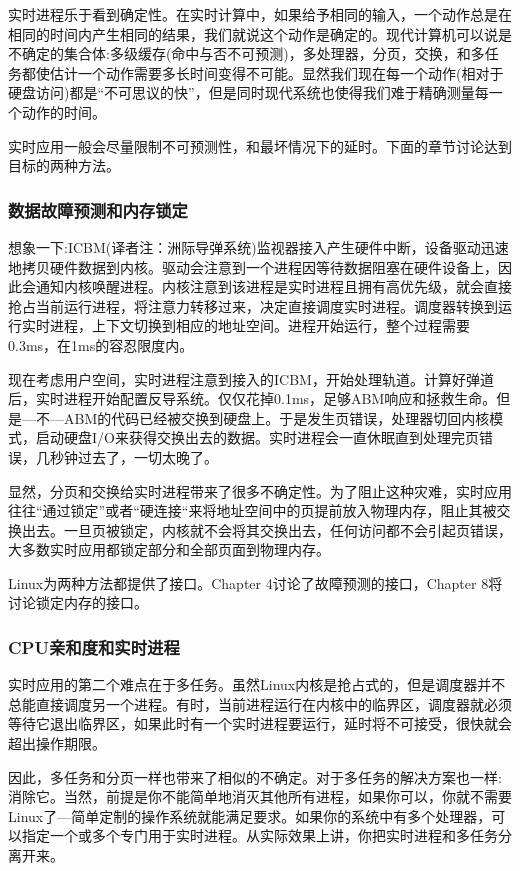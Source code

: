   实时进程乐于看到确定性。在实时计算中，如果给予相同的输入，一个动作总是在相同的时间内产生相同的结果，我们就说这个动作是确定的。现代计算机可以说是不确定的集合体:多级缓存(命中与否不可预测)，多处理器，分页，交换，和多任务都使估计一个动作需要多长时间变得不可能。显然我们现在每一个动作(相对于硬盘访问)都是“不可思议的快”，但是同时现代系统也使得我们难于精确测量每一个动作的时间。

  实时应用一般会尽量限制不可预测性，和最坏情况下的延时。下面的章节讨论达到目标的两种方法。

\subsubsection{数据故障预测和内存锁定}

  想象一下:ICBM(译者注：洲际导弹系统)监视器接入产生硬件中断，设备驱动迅速地拷贝硬件数据到内核。驱动会注意到一个进程因等待数据阻塞在硬件设备上，因此会通知内核唤醒进程。内核注意到该进程是实时进程且拥有高优先级，就会直接抢占当前运行进程，将注意力转移过来，决定直接调度实时进程。调度器转换到运行实时进程，上下文切换到相应的地址空间。进程开始运行，整个过程需要0.3ms，在1ms的容忍限度内。

  现在考虑用户空间，实时进程注意到接入的ICBM，开始处理轨道。计算好弹道后，实时进程开始配置反导系统。仅仅花掉0.1ms，足够ABM响应和拯救生命。但是---不---ABM的代码已经被交换到硬盘上。于是发生页错误，处理器切回内核模式，启动硬盘I/O来获得交换出去的数据。实时进程会一直休眠直到处理完页错误，几秒钟过去了，一切太晚了。

  显然，分页和交换给实时进程带来了很多不确定性。为了阻止这种灾难，实时应用往往“通过锁定”或者“硬连接“来将地址空间中的页提前放入物理内存，阻止其被交换出去。一旦页被锁定，内核就不会将其交换出去，任何访问都不会引起页错误，大多数实时应用都锁定部分和全部页面到物理内存。

  Linux为两种方法都提供了接口。Chapter 4讨论了故障预测的接口，Chapter 8将讨论锁定内存的接口。

\subsubsection{CPU亲和度和实时进程}

  实时应用的第二个难点在于多任务。虽然Linux内核是抢占式的，但是调度器并不总能直接调度另一个进程。有时，当前进程运行在内核中的临界区，调度器就必须等待它退出临界区，如果此时有一个实时进程要运行，延时将不可接受，很快就会超出操作期限。

  因此，多任务和分页一样也带来了相似的不确定。对于多任务的解决方案也一样:消除它。当然，前提是你不能简单地消灭其他所有进程，如果你可以，你就不需要Linux了---简单定制的操作系统就能满足要求。如果你的系统中有多个处理器，可以指定一个或多个专门用于实时进程。从实际效果上讲，你把实时进程和多任务分离开来。

